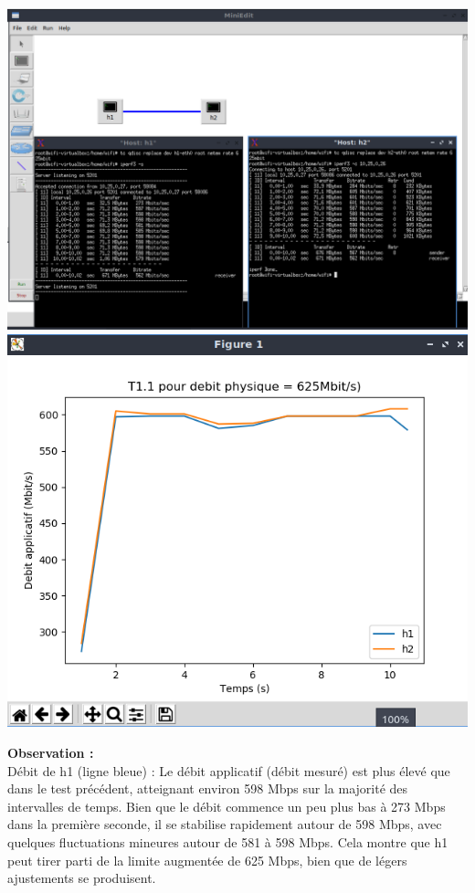 \begin{center}
    \includegraphics[width=1\textwidth]{./images/T1.1/625test1.png}
    \includegraphics[width=1\textwidth]{./images/T1.1/courbe625test1.png}
\end{center}
\textbf{Observation :}\\
Débit de h1 (ligne bleue) :  Le débit applicatif (débit mesuré) est plus élevé que dans le test précédent, atteignant environ 598 Mbps sur la majorité des intervalles de temps. Bien que le débit commence un peu plus bas à 273 Mbps dans la première seconde, il se stabilise rapidement autour de 598 Mbps, avec quelques fluctuations mineures autour de 581 à 598 Mbps. Cela montre que h1 peut tirer parti de la limite augmentée de 625 Mbps, bien que de légers ajustements se produisent.
